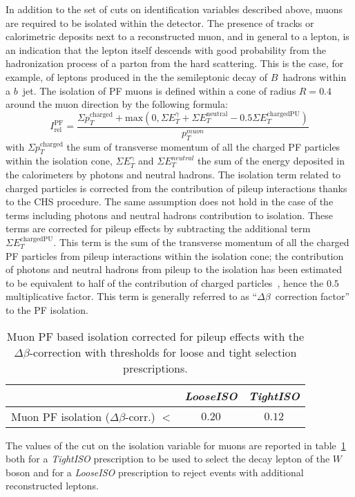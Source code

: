 In addition to the set of cuts on identification variables described above,
muons are required to be isolated within the detector.
The presence of tracks or calorimetric deposits next to a reconstructed 
muon, and in general to a lepton, is an indication that the lepton itself 
descends with good probability from the hadronization process of a parton from the 
hard scattering. This is the case, for example, of leptons produced 
in the the semileptonic decay of $B$~hadrons within a $b$~jet.
The isolation of PF muons is defined within a cone of radius
$R = 0.4$ around the muon direction by the following formula:
$$I_{\mathrm{rel}}^{\mathrm{PF}} = \frac{\Sigma p_{T}^{\mathrm{charged}}+\mathrm{max}\left( 0, \Sigma E_{T}^{\gamma} + \Sigma E_{T}^{\mathrm{neutral}} - 0.5\Sigma E_{T}^{\mathrm{charged PU}} \right)}{p_{T}^{muon}}$$
with $\Sigma p_{T}^{\mathrm{charged}}$ the sum of transverse momentum of 
all the charged PF particles within the isolation cone, $\Sigma E_{T}^{\mathrm{\gamma}}$ 
and $\Sigma E_{T}^{neutral}$ the sum of the energy deposited in the calorimeters 
by photons and neutral hadrons. The isolation term related to charged particles is corrected 
from the contribution of pileup interactions thanks to the CHS procedure.
The same assumption does not hold in the case of the terms including 
photons and neutral hadrons contribution to isolation. 
These terms are corrected for pileup effects 
by subtracting the additional term $\Sigma E_{T}^{\mathrm{charged PU}}$.
This term is the sum of the transverse momentum of all the charged PF particles 
from pileup interactions within the isolation cone; 
the contribution of photons and neutral hadrons from pileup to the 
isolation has been estimated to be equivalent to half of the 
contribution of charged particles~\cite{neutralpileupestimate-PAS-PFT-10-002},
hence the $0.5$ multiplicative factor.
This term is generally referred to as ``$\Delta\beta$~correction
factor'' to the PF isolation.
\begin{table}[h]
\begin{center}
\begin{tabular}{rcc}
\hline
& \textit{LooseISO} & \textit{TightISO}\\
\hline
Muon PF isolation ($\Delta\beta$-corr.) $<$ & $0.20$ & $0.12$\\
 \hline
\end{tabular}
\end{center}
\caption{Muon PF based isolation corrected for pileup effects with the 
  $\Delta\beta$-correction with thresholds for loose and tight selection
  prescriptions.}
\label{tab:muoniso}
\end{table}
The values of the cut on the isolation variable for muons are reported in 
table~\ref{tab:muoniso} both for a \textit{TightISO} prescription
to be used to select the decay lepton of the $W$ boson and for a 
\textit{LooseISO} prescription to reject events with additional 
reconstructed leptons.

